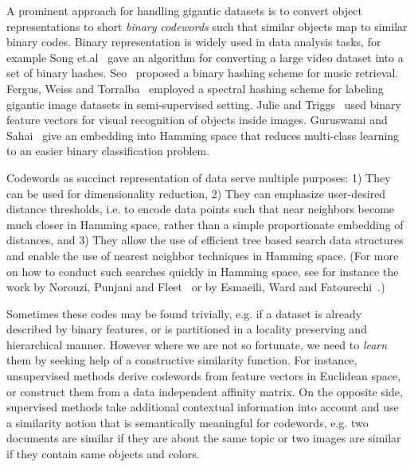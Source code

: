 \documentclass{sig-alternate}
\begin{document}
A prominent approach for handling gigantic datasets is to convert object representations to short \textit{binary codewords} such that similar objects map to similar binary codes.
Binary representation is widely used in data analysis tasks, for example Song et.al~\cite{videosearch} gave an algorithm for converting a large video dataset into a set of binary hashes. Seo~\cite{seo} proposed a binary hashing scheme for music retrieval. Fergus, Weiss and Torralba~\cite{fergus2009semi} employed a spectral hashing scheme for labeling gigantic image datasets in semi-supervised setting. Julie and Triggs~\cite{recognition} used binary feature vectors for visual recognition of objects inside images. Guruswami and Sahai~\cite{ecc} give an embedding into Hamming space that reduces multi-class learning to an easier binary classification problem.

Codewords as succinct representation of data serve multiple purposes: 1) They can be used for dimensionality reduction, 2) They can emphasize user-desired distance thresholds, i.e. to encode data points such that near neighbors become much closer in Hamming space, rather than a simple proportionate embedding of distances, and 3) They allow the use of efficient tree based search data structures and enable the use of nearest neighbor techniques in Hamming space. (For more on how to conduct such searches quickly in Hamming space, see for instance the work by Norouzi, Punjani and Fleet~\cite{fasthamming} or by 
Esmaeili, Ward and Fatourechi~\cite{2012fast}.)



Sometimes these codes may be found trivially, e.g. if a dataset is already described by binary features, or is partitioned in a locality preserving and hierarchical manner. 
However where we are not so fortunate, we need to \emph{learn} them by seeking help of a constructive similarity function.
For instance,
unsupervised methods derive codewords from feature vectors in Euclidean space, or construct them from a data independent affinity matrix. 
On the opposite side, supervised methods \cite{torralba2008small,semantic} take additional contextual information into account and use a similarity notion that is semantically meaningful for codewords, e.g. two documents are similar if they are about the same topic or two images are similar if they contain same objects and colors.
\end{document}
